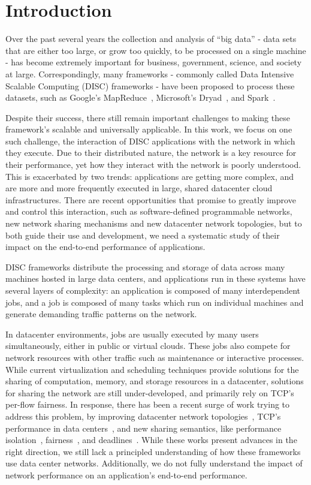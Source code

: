 \section{Introduction}
\label{sec:intro}

Over the past several years the collection and analysis of ``big data'' - data 
sets that are either too large, or grow too quickly, to be processed on a single 
machine - has become extremely important for business, government, science, and 
society at large. Correspondingly, many frameworks - commonly called Data 
Intensive Scalable Computing (DISC) frameworks - have been proposed to process 
these datasets, such as Google's MapReduce~\cite{mapreduce}, Microsoft's 
Dryad~\cite{dryad}, and Spark~\cite{spark}. 

Despite their success, there still remain important challenges to making these 
framework's scalable and universally applicable. In this work, we focus on one 
such challenge, the interaction of DISC applications with the network in which they 
execute. Due to their distributed nature, the network is a key resource for 
their performance, yet how they interact with the network is poorly understood. 
This is exacerbated by two trends: applications are getting more complex, and 
are more and more frequently executed in large, shared datacenter cloud 
infrastructures. There are recent opportunities that promise to greatly improve 
and control this interaction, such as software-defined programmable networks, 
new network sharing mechanisms and new datacenter network topologies, but to 
both guide their use and development, we need a systematic study of their 
impact on the end-to-end performance of applications. 

DISC frameworks distribute the processing and storage of data across many 
machines hosted in large data centers, and applications run in these systems 
have several layers of complexity: an application is composed of many 
interdependent jobs, and a job is composed of many tasks which run on individual 
machines and generate demanding traffic patterns on the network.

In datacenter environments, jobs are usually executed by many users 
simultaneously, either in public or virtual clouds. These jobs also compete for 
network resources with other traffic such as maintenance or interactive 
processes. While current virtualization and scheduling techniques provide 
solutions for the sharing of computation, memory, and storage resources in a 
datacenter, solutions for sharing the network are still under-developed, and 
primarily rely on TCP’s per-flow fairness. In response, there has been a recent 
surge of work trying to address this problem, by improving datacenter network 
topologies~\cite{fattree, vl2}, TCP’s performance in data 
centers~\cite{XCP, DCTCP}, and new sharing semantics, like performance 
isolation~\cite{Oktopus}, fairness~\cite{faircloud}, and deadlines~\cite{D3}. 
While these works present advances in the right direction, we still lack a 
principled understanding of how these frameworks use data center networks. 
Additionally, we do not fully understand the impact of network performance on 
an application’s end-to-end performance.


